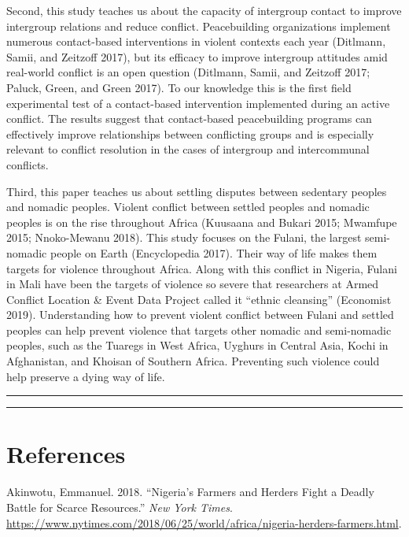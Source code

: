 \documentclass[11pt]{article}
\begin{document}
Second, this study teaches us about the capacity of intergroup contact
to improve intergroup relations and reduce conflict. Peacebuilding
organizations implement numerous contact-based interventions in violent
contexts each year (Ditlmann, Samii, and Zeitzoff 2017), but its
efficacy to improve intergroup attitudes amid real-world conflict is an
open question (Ditlmann, Samii, and Zeitzoff 2017; Paluck, Green, and
Green 2017). To our knowledge this is the first field experimental test
of a contact-based intervention implemented during an active conflict.
The results suggest that contact-based peacebuilding programs can
effectively improve relationships between conflicting groups and is
especially relevant to conflict resolution in the cases of intergroup
and intercommunal conflicts.

Third, this paper teaches us about settling disputes between sedentary
peoples and nomadic peoples. Violent conflict between settled peoples
and nomadic peoples is on the rise throughout Africa (Kuusaana and
Bukari 2015; Mwamfupe 2015; Nnoko-Mewanu 2018). This study focuses on
the Fulani, the largest semi-nomadic people on Earth (Encyclopedia
2017). Their way of life makes them targets for violence throughout
Africa. Along with this conflict in Nigeria, Fulani in Mali have been
the targets of violence so severe that researchers at Armed Conflict
Location \& Event Data Project called it ``ethnic cleansing'' (Economist
2019). Understanding how to prevent violent conflict between Fulani and
settled peoples can help prevent violence that targets other nomadic and
semi-nomadic peoples, such as the Tuaregs in West Africa, Uyghurs in
Central Asia, Kochi in Afghanistan, and Khoisan of Southern Africa.
Preventing such violence could help preserve a dying way of life.

\begin{center}\rule{0.5\linewidth}{\linethickness}\end{center}

\begin{center}\rule{0.5\linewidth}{\linethickness}\end{center}

\hypertarget{references}{%
\section*{References}\label{references}}

\hypertarget{refs}{}
\leavevmode\hypertarget{ref-nyt2018nigeria}{}%
Akinwotu, Emmanuel. 2018. ``Nigeria's Farmers and Herders Fight a Deadly
Battle for Scarce Resources.'' \emph{New York Times}.
\url{https://www.nytimes.com/2018/06/25/world/africa/nigeria-herders-farmers.html}.
\end{document}
